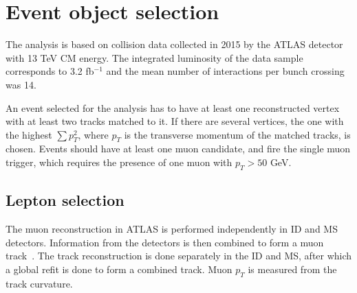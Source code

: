 

\section{Event object selection}
\label{sec:wprimeSelection}

The analysis is based on \pp collision data collected in 2015 by the ATLAS detector with 13 TeV CM energy.
The integrated luminosity of the data sample corresponds to 3.2 fb$^{-1}$ and the mean number of interactions per bunch crossing was 14.

An event selected for the analysis has to have at least one reconstructed vertex with at least two tracks matched to it. 
If there are several vertices, the one with the highest
$\sum p^2_T$, where $p_T$ is the transverse momentum of the matched tracks, is chosen.
Events should have at least one muon candidate, and fire the single muon trigger, 
which requires the presence of one muon with $p_T > 50$ GeV.

\subsection{Lepton selection}
\label{subsec:lepton_selection}
The muon reconstruction in ATLAS is performed independently in ID and MS detectors. 
Information from the detectors is then combined to form a muon track~\cite{muon_performance_2015}.
The track reconstruction is done 
separately in the ID and MS, after which a global refit is done to form a combined track.
Muon $p_T$ is measured from the track curvature.


